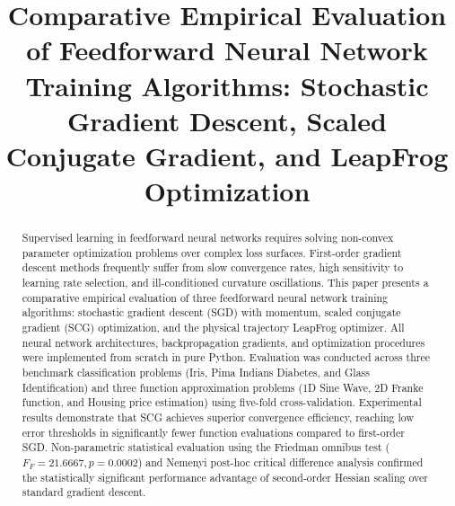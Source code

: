 \documentclass[10pt, conference]{IEEEtran}
\begin{document}
\title{Comparative Empirical Evaluation of Feedforward Neural Network Training Algorithms: Stochastic Gradient Descent, Scaled Conjugate Gradient, and LeapFrog Optimization}

\author{
}

\maketitle

\begin{abstract}
Supervised learning in feedforward neural networks requires solving non-convex parameter optimization problems over complex loss surfaces. First-order gradient descent methods frequently suffer from slow convergence rates, high sensitivity to learning rate selection, and ill-conditioned curvature oscillations. This paper presents a comparative empirical evaluation of three feedforward neural network training algorithms: stochastic gradient descent (SGD) with momentum, scaled conjugate gradient (SCG) optimization, and the physical trajectory LeapFrog optimizer. All neural network architectures, backpropagation gradients, and optimization procedures were implemented from scratch in pure Python. Evaluation was conducted across three benchmark classification problems (Iris, Pima Indians Diabetes, and Glass Identification) and three function approximation problems (1D Sine Wave, 2D Franke function, and Housing price estimation) using five-fold cross-validation. Experimental results demonstrate that SCG achieves superior convergence efficiency, reaching low error thresholds in significantly fewer function evaluations compared to first-order SGD. Non-parametric statistical evaluation using the Friedman omnibus test ($F_F = 21.6667, p = 0.0002$) and Nemenyi post-hoc critical difference analysis confirmed the statistically significant performance advantage of second-order Hessian scaling over standard gradient descent.
\end{abstract}

\end{document}
